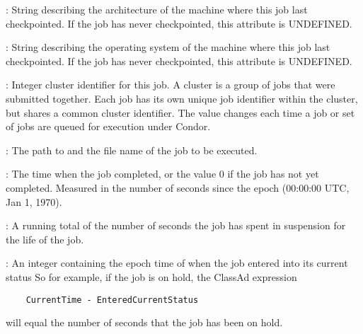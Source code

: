 \begin{description}


\item[\AdAttr{CkptArch}] : String describing the architecture of the machine
where this job last checkpointed.  If the job has never checkpointed,
this attribute is UNDEFINED.

\item[\AdAttr{CkptOpSys}] : String describing the operating system of
the machine where this job last checkpointed.  If the job has never
checkpointed, this attribute is UNDEFINED.

\item[\AdAttr{ClusterId}] : Integer cluster identifier for this job.
A cluster is a group of jobs that were submitted together.  Each
job has its own unique job identifier within the cluster, but shares a
common cluster identifier.
The value changes each time a job or set of jobs are queued for
execution under Condor.

\item[\AdAttr{Cmd}] : The path to and the file name of the job to be executed.

\item[\AdAttr{CompletionDate}] : The time when the job completed,
or the value 0 if the job has not yet completed.
Measured in the
number of seconds since the epoch (00:00:00 UTC, Jan 1, 1970).

\item[\AdAttr{CumulativeSuspensionTime}] : A running total of the number of
seconds the job has spent in suspension for the life of the job.

\item[\AdAttr{EnteredCurrentStatus}] : An integer containing the
epoch time of when the job entered into its current status
So for example, if the job is on hold, the ClassAd expression
\begin{verbatim}
    CurrentTime - EnteredCurrentStatus
\end{verbatim}
will equal the number of seconds that the job has been on hold.


\end{description}
